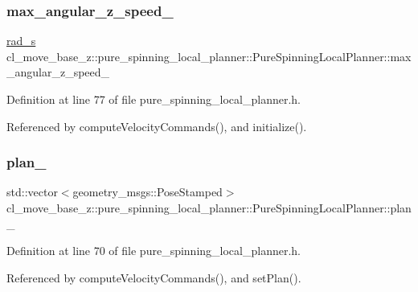 \subsubsection{\texorpdfstring{max\+\_\+angular\+\_\+z\+\_\+speed\+\_\+}{max\_angular\_z\_speed\_}}
{\footnotesize\ttfamily \hyperlink{pure__spinning__local__planner_8h_a76bf9d2bc75b779e3418b2320c652037}{rad\+\_\+s} cl\+\_\+move\+\_\+base\+\_\+z\+::pure\+\_\+spinning\+\_\+local\+\_\+planner\+::\+Pure\+Spinning\+Local\+Planner\+::max\+\_\+angular\+\_\+z\+\_\+speed\+\_\+\hspace{0.3cm}{\ttfamily [private]}}



Definition at line 77 of file pure\+\_\+spinning\+\_\+local\+\_\+planner.\+h.



Referenced by compute\+Velocity\+Commands(), and initialize().

\mbox{\label{classcl__move__base__z_1_1pure__spinning__local__planner_1_1PureSpinningLocalPlanner_a31875ee78bae4698b579e20c0754860d}} 
\subsubsection{\texorpdfstring{plan\+\_\+}{plan\_}}
{\footnotesize\ttfamily std\+::vector$<$geometry\+\_\+msgs\+::\+Pose\+Stamped$>$ cl\+\_\+move\+\_\+base\+\_\+z\+::pure\+\_\+spinning\+\_\+local\+\_\+planner\+::\+Pure\+Spinning\+Local\+Planner\+::plan\+\_\+\hspace{0.3cm}{\ttfamily [private]}}



Definition at line 70 of file pure\+\_\+spinning\+\_\+local\+\_\+planner.\+h.



Referenced by compute\+Velocity\+Commands(), and set\+Plan().

